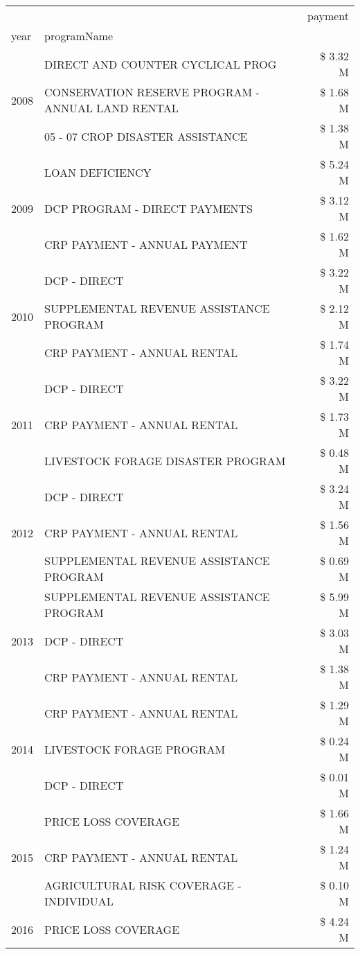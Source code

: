 \begin{tabular}{llr}
\toprule
 &  & payment \\
year & programName &  \\
\midrule
\multirow[t]{3}{*}{2008} & DIRECT AND COUNTER CYCLICAL PROG & \$ 3.32 M \\
 & CONSERVATION RESERVE PROGRAM - ANNUAL LAND RENTAL & \$ 1.68 M \\
 & 05 - 07 CROP DISASTER ASSISTANCE & \$ 1.38 M \\
\cline{1-3}
\multirow[t]{3}{*}{2009} & LOAN DEFICIENCY & \$ 5.24 M \\
 & DCP PROGRAM - DIRECT PAYMENTS & \$ 3.12 M \\
 & CRP PAYMENT - ANNUAL PAYMENT & \$ 1.62 M \\
\cline{1-3}
\multirow[t]{3}{*}{2010} & DCP - DIRECT & \$ 3.22 M \\
 & SUPPLEMENTAL REVENUE ASSISTANCE PROGRAM & \$ 2.12 M \\
 & CRP PAYMENT - ANNUAL RENTAL & \$ 1.74 M \\
\cline{1-3}
\multirow[t]{3}{*}{2011} & DCP - DIRECT & \$ 3.22 M \\
 & CRP PAYMENT - ANNUAL RENTAL & \$ 1.73 M \\
 & LIVESTOCK FORAGE DISASTER PROGRAM & \$ 0.48 M \\
\cline{1-3}
\multirow[t]{3}{*}{2012} & DCP - DIRECT & \$ 3.24 M \\
 & CRP PAYMENT - ANNUAL RENTAL & \$ 1.56 M \\
 & SUPPLEMENTAL REVENUE ASSISTANCE PROGRAM & \$ 0.69 M \\
\cline{1-3}
\multirow[t]{3}{*}{2013} & SUPPLEMENTAL REVENUE ASSISTANCE PROGRAM & \$ 5.99 M \\
 & DCP - DIRECT & \$ 3.03 M \\
 & CRP PAYMENT - ANNUAL RENTAL & \$ 1.38 M \\
\cline{1-3}
\multirow[t]{3}{*}{2014} & CRP PAYMENT - ANNUAL RENTAL & \$ 1.29 M \\
 & LIVESTOCK FORAGE PROGRAM & \$ 0.24 M \\
 & DCP - DIRECT & \$ 0.01 M \\
\cline{1-3}
\multirow[t]{3}{*}{2015} & PRICE LOSS COVERAGE & \$ 1.66 M \\
 & CRP PAYMENT - ANNUAL RENTAL & \$ 1.24 M \\
 & AGRICULTURAL RISK COVERAGE - INDIVIDUAL & \$ 0.10 M \\
\cline{1-3}
\multirow[t]{3}{*}{2016} & PRICE LOSS COVERAGE & \$ 4.24 M \\

\end{tabular}
